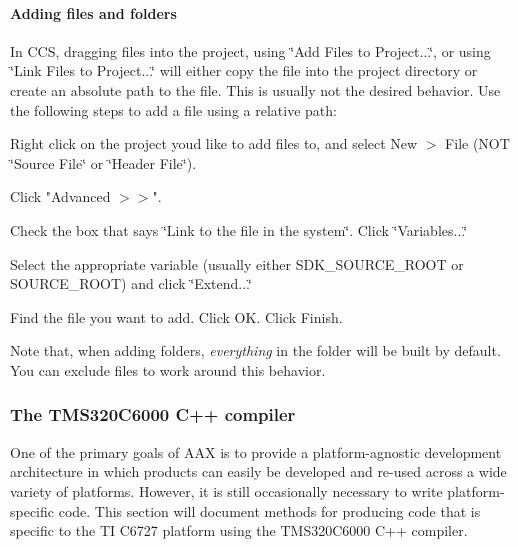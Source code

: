 \hypertarget{a00362_subsubsection__adding_files_and_folders_}{}\paragraph{Adding files and folders}\label{a00362_subsubsection__adding_files_and_folders_}
 In C\+C\+S, dragging files into the project, using \char`\"{}\+Add Files to Project...\char`\"{}, or using \char`\"{}\+Link Files to Project...\char`\"{} will either copy the file into the project directory or create an absolute path to the file. This is usually not the desired behavior. Use the following steps to add a file using a relative path\+: {\itshape  ~} 
\begin{DoxyEnumerate}
\item Right click on the project you\textquotesingle{}d like to add files to, and select New $>$ File (N\+O\+T \char`\"{}\+Source File\char`\"{} or \char`\"{}\+Header File\char`\"{}).  
\item Click "Advanced $>$$>$".  
\item Check the box that says \char`\"{}\+Link to the file in the system\char`\"{}. Click \char`\"{}\+Variables...\char`\"{}  
\item Select the appropriate variable (usually either {\ttfamily S\+D\+K\+\_\+\+S\+O\+U\+R\+C\+E\+\_\+\+R\+O\+O\+T} or {\ttfamily S\+O\+U\+R\+C\+E\+\_\+\+R\+O\+O\+T}) and click \char`\"{}\+Extend...\char`\"{}  
\item Find the file you want to add. Click O\+K. Click Finish.  
\end{DoxyEnumerate}

Note that, when adding folders, {\itshape everything} in the folder will be built by default. You can exclude files to work around this behavior.

\hypertarget{a00362_subsection__the_tms320c6000_cpp_compiler}{}\subsubsection{The T\+M\+S320\+C6000 C++ compiler}\label{a00362_subsection__the_tms320c6000_cpp_compiler}
 One of the primary goals of A\+A\+X is to provide a platform-\/agnostic development architecture in which products can easily be developed and re-\/used across a wide variety of platforms. However, it is still occasionally necessary to write platform-\/specific code. This section will document methods for producing code that is specific to the T\+I C6727 platform using the T\+M\+S320\+C6000 C++ compiler.

